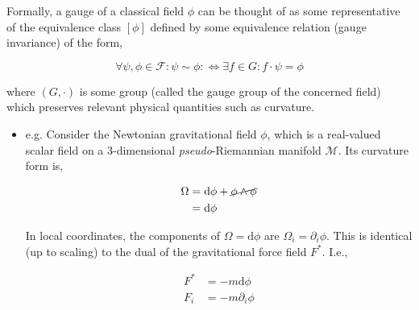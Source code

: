 \documentclass[9pt,handout]{beamer}
\begin{document}
\begin{frame}{}
\begin{definition}
Formally, a gauge of a classical field $\phi$ can be thought of as some representative of the equivalence class $\left[ \phi \right]$ defined by some equivalence relation (gauge invariance) of the form,

$$\forall \psi, \phi \in \mathcal{F} : \psi \sim \phi : \Longleftrightarrow \exists f \in G :  f \cdot \psi = \phi$$

where $\left( G, \cdot \right)$ is some group (called the gauge group of the concerned field) which preserves relevant physical quantities such as curvature.
\end{definition}

\begin{itemize}
\item e.g. Consider the Newtonian gravitational field $\phi$, which is a real-valued scalar field on a 3-dimensional \emph{pseudo}-Riemannian manifold $\mathcal{M}$. Its curvature form is,

\begin{align*}
\Omega & = \text{d}\phi + \cancel{\phi \wedge \phi} \\
& = \text{d} \phi
\end{align*}

In local coordinates, the components of $\Omega = \text{d}\phi$ are $\Omega_i = \partial_i \phi$. This is identical (up to scaling) to the dual of the gravitational force field $F^*$. I.e.,

\begin{align*}
F^* & = - m \text{d} \phi \\
F_i & = - m \partial_i \phi
\end{align*}
\end{itemize}
\end{frame}
\end{document}
